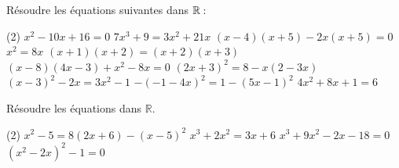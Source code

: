 \documentclass[a4paper,12pt]{report}
\begin{document}

\begin{exo}
	Résoudre les équations suivantes dans $\mathbb R$\,:
	\begin{tasks}(2)
\task $x^2-10 x+16=0$
\task $7 x^3+9=3 x^2+21 x$
\task $(x-4)(x+5)-2 x(x+5)=0$
\task $x^2=8 x$
\task $(x+1)(x+2)=(x+2)(x+3)$
\task $(x-8)(4 x-3)+x^2-8 x=0$
\task $(2 x+3)^2=8-x(2-3 x)$
\task $(x-3)^2-2 x=3 x^2-1$
\task $-(-1-4 x)^2=1-(5 x-1)^2$
\task $4 x^2+8 x+1=6$
	\end{tasks}
\end{exo}
\begin{exo}
Résoudre les équations dans $\mathbb{R}$.
\begin{tasks}(2)	
\task $x^2-5=8(2 x+6)-(x-5)^2$
\task $x^3+2 x^2=3 x+6$
\task $x^3+9 x^2-2 x-18=0$
\task $\left(x^2-2 x\right)^2-1=0$
\end{tasks}
\end{exo}
\end{document}
